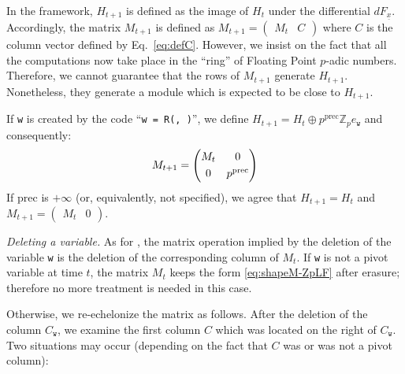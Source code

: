 \documentclass[sigconf]{acmart}
\newcommand{\ph}{\vphantom{$A^A_A$}}
\newcommand{\Z}{\mathbb Z}
\newcommand{\Zp}{\Z_p}
\newcommand{\ttv}{\texttt{v}\xspace}
\newcommand{\ttw}{\texttt{w}\xspace}
\newcommand{\ZpLC}{\text{\color{output} \rm \tt ZpLC}\xspace}
\newcommand{\ZpLF}{\text{\color{output} \rm \tt ZpLF}\xspace}
\theoremstyle{definition}
\begin{document}
In the \ZpLF framework, $H_{t+1}$ is defined as the image of $H_t$
under the differential $dF_{\underline x}$. Accordingly, the matrix
$M_{t+1}$ is defined as $M_{t+1} = \left(\begin{matrix}
M_t & C \end{matrix}\right)$
where $C$ is the column vector defined by Eq.~\eqref{eq:defC}.
However, we insist on the fact that all the computations now take
place in the ``ring'' of Floating Point $p$-adic numbers. Therefore,
we cannot guarantee that the rows of $M_{t+1}$ generate $H_{t+1}$.
Nonetheless, they generate a module which is expected to be close
to $H_{t+1}$.

\smallskip

If \ttw is created by the code
``\verb?w = ?\verb?R(?\verb?, ?\verb?)?'',
we define $H_{t+1} = H_t \oplus p^{\text{prec}} \Zp e_\ttw$ and consequently:
$$M_{t+1} = \left(\begin{matrix}
M_t & 0 \smallskip \\ 0 & p^{\text{prec}}
\end{matrix}\right)$$
If $\text{prec}$ is $+\infty$ (or, equivalently, not specified), we
agree that $H_{t+1} = H_t$ and $M_{t+1} = (\begin{matrix} M_t & 0 
\end{matrix})$.

\medskip

\noindent \textit{Deleting a variable.} 
% 
As for \ZpLC, the matrix operation implied by the deletion of the 
variable \ttw is the deletion of the corresponding column of $M_t$. If 
\ttw is not a pivot variable at time $t$, the matrix $M_t$ keeps the 
form \eqref{eq:shapeM-ZpLF} after erasure; therefore no more treatment 
is needed in this case.

Otherwise, we re-echelonize the matrix as follows. After the deletion 
of the column $C_\ttw$, we examine the first column $C$ which was 
located on the right of $C_\ttw$. Two situations may occur (depending
on the fact that $C$ was or was not a pivot column):

\noindent \hfill
{}
\hfill\null
\end{document}
